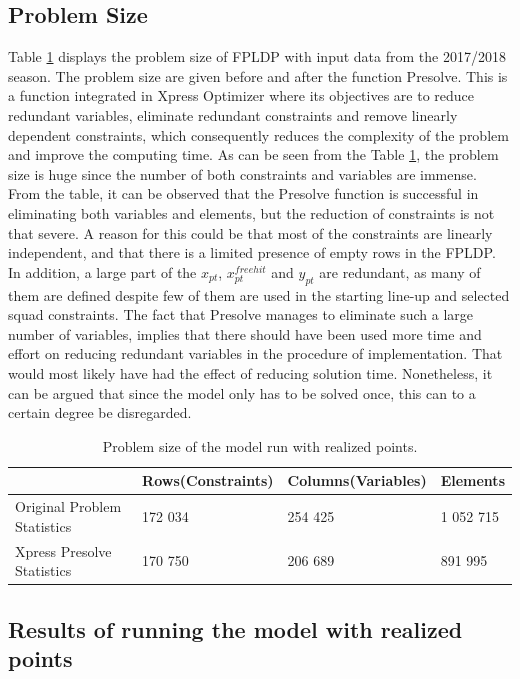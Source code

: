 \subsection{Problem Size}

Table \ref{tab:computational_statistics} displays the problem size of FPLDP with input data from the 2017/2018 season. The problem size are given before and after the function Presolve. This is a function integrated in Xpress Optimizer where its objectives are to reduce redundant variables, eliminate redundant constraints and remove linearly dependent constraints, which consequently reduces the complexity of the problem and improve the computing time. As can be seen from the Table \ref{tab:computational_statistics}, the problem size is huge since the number of both constraints and variables are immense. From the table, it can be observed that the Presolve function is successful in eliminating both variables and elements, but the reduction of constraints is not that severe. A reason for this could be that most of the constraints are linearly independent, and that there is a limited presence of empty rows in the FPLDP. In addition, a large part of the $x_{pt}$, $x_{pt}^{freehit}$ and $y_{pt}$ are redundant, as many of them are defined despite few of them are used in the starting line-up and selected squad constraints. The fact that Presolve manages to eliminate such a large number of variables, implies that there should have been used more time and effort on reducing redundant variables in the procedure of implementation. That would most likely have had the effect of reducing solution time. Nonetheless, it can be argued that since the model only has to be solved once, this can to a certain degree be disregarded. 


\begin{table}[H]
\centering
\begin{tabular}{@{}llll@{}}
\toprule
                            & Rows(Constraints)    & Columns(Variables) & Elements \\ \midrule
Original Problem Statistics & 172 034 & 254 425  & 1 052 715  \\
Xpress Presolve Statistics  & 170 750 & 206 689  & 891 995   \\ \bottomrule
\end{tabular}
\caption{Problem size of the model run with realized points.}
\label{tab:computational_statistics}
\end{table}


\subsection{Results of running the model with realized points}

